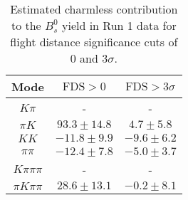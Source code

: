 \begin{table}[h]
  \centering
  \begin{tabular}{ccc}
      \toprule
      Mode & $\mathrm{FDS} > 0$ & $\mathrm{FDS} > 3\sigma$ \\
      \midrule
      $K\pi$ & \-- & \-- \\
      $\pi K$ & $93.3 \pm 14.8$ & $4.7 \pm 5.8$ \\
      $KK$ & $-11.8 \pm 9.9$ & $-9.6 \pm 6.2$ \\
      $\pi\pi$ & $-12.4 \pm 7.8$ & $-5.0 \pm 3.7$ \\
      $K\pi\pi\pi$ & \-- & \-- \\
      $\pi K\pi\pi$ & $28.6 \pm 13.1$ & $-0.2 \pm 8.1$ \\
      \bottomrule
  \end{tabular}
  \caption{\small Estimated charmless contribution to the $B^{0}_{s}$ yield in Run 1 data for flight distance significance cuts of 0  and $3\sigma$.}
\label{tab:charmless_yields_Bs_run_1}
\end{table}
